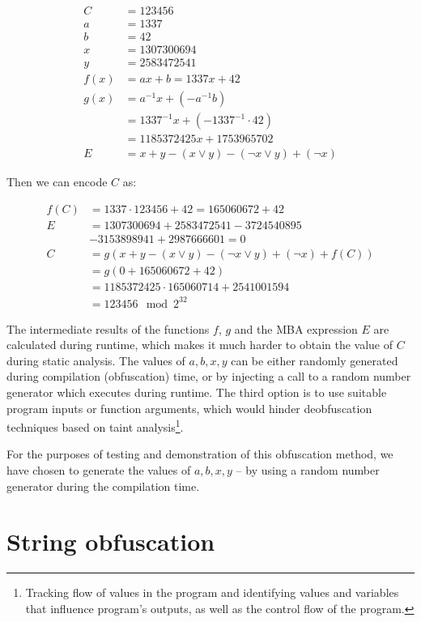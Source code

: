 \documentclass[
  digital, %
  table,   %
  twoside, %
  nolof,     %
  nolot,     %
]{fithesis3}
\theoremstyle{definition}
\begin{document}
\begin{align*}
C & = 123456 \\
a &= 1337 \\
b &= 42\\
x &= 1307300694 \\
y &= 2583472541 \\
f(x) &= ax + b = 1337x + 42\\
g(x) &= a^{-1}x + (-a^{-1}b) \\
&= 1337^{-1}x + (-1337^{-1}\cdot 42) 
\\&= 1185372425x + 1753965702 \\
E &= x + y - (x \vee y)-(\neg x \vee y)+(\neg x)
\end{align*}

Then we can encode $C$ as:

\begin{align*}
    f(C) &= 1337\cdot 123456 + 42 = 165060672 + 42 \\
    E &= 1307300694 + 2583472541 - 3724540895\\& - 3153898941 + 2987666601 = 0 \\
    C &= g(x + y - (x \vee y)-(\neg x \vee y)+(\neg x) + f(C)) \\
    &= g(0 + 165060672 + 42) \\
    &= 1185372425\cdot165060714 + 2541001594\\
    &= 123456 \mod 2^{32}
\end{align*}

The intermediate results of the functions $f$, $g$ and the MBA expression $E$ are calculated during runtime, which makes it much harder to obtain the value of $C$ during static analysis. The values of $a,b,x,y$ can be either randomly generated during compilation (obfuscation) time,  or by injecting a call to a random number generator which executes during runtime. The third option is to use suitable program inputs or function arguments, which would hinder deobfuscation techniques based on taint analysis\footnote{Tracking flow of values in the program and identifying values and variables that influence program's outputs, as well as the control flow of the program.}. 

For the purposes of testing and demonstration of this obfuscation method, we have chosen to generate the values of $a,b,x,y$ -- by using a random number generator during the compilation time.

\section{String obfuscation}
\end{document}
